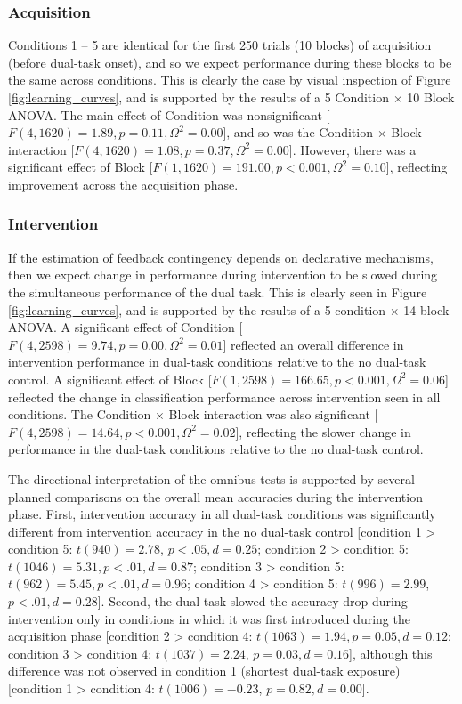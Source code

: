 \subsubsection*{Acquisition}
Conditions 1 -- 5 are identical for the first 250 trials (10 blocks) of
acquisition (before dual-task onset), and so we expect performance during these
blocks to be the same across conditions. This is clearly the case by visual
inspection of Figure \ref{fig:learning_curves}, and is supported by the results
of a 5 Condition $\times$ 10 Block ANOVA. The main effect of Condition was
nonsignificant [$F(4,1620) = 1.89, p = 0.11, \Omega^2 = 0.00$], and so was the
Condition $\times$ Block interaction [$F(4,1620) = 1.08, p = 0.37, \Omega^2 =
0.00$]. However, there was a significant effect of Block [$F(1,1620) = 191.00, p
< 0.001, \Omega^2 = 0.10$], reflecting improvement across the acquisition phase.

\subsubsection*{Intervention}
If the estimation of feedback contingency depends on declarative mechanisms,
then we expect change in performance during intervention to be slowed during the
simultaneous performance of the dual task. This is clearly seen in Figure
\ref{fig:learning_curves}, and is supported by the results of a 5 condition
$\times$ 14 block ANOVA. A significant effect of Condition [$F(4,2598) = 9.74, p
= 0.00, \Omega^2 = 0.01$] reflected an overall difference in intervention
performance in dual-task conditions relative to the no dual-task control. A
significant effect of Block [$F(1,2598) = 166.65, p < 0.001, \Omega^2 = 0.06$]
reflected the change in classification performance across intervention seen in
all conditions. The Condition $\times$ Block interaction was also significant
[$F(4,2598) = 14.64, p < 0.001, \Omega^2 = 0.02$], reflecting the slower change
in performance in the dual-task conditions relative to the no dual-task control.

The directional interpretation of the omnibus tests is supported by several
planned comparisons on the overall mean accuracies during the intervention
phase. First, intervention accuracy in all dual-task conditions was
significantly different from intervention accuracy in the no dual-task
control 
[condition  1 > condition  5: $t(940) = 2.78$, $p < .05, d = 0.25$;
condition  2 > condition  5: $t(1046) = 5.31, p < .01, d = 0.87$;
condition  3 > condition  5: $t(962) = 5.45, p < .01, d = 0.96$;
condition  4 > condition  5: $t(996) = 2.99$, $p < .01, d = 0.28$].
Second, the dual task slowed the accuracy drop during intervention only in
conditions in which it was first introduced during the acquisition phase
[condition  2 > condition  4: $t(1063) = 1.94, p = 0.05, d = 0.12$;
condition  3 > condition  4: $t(1037) = 2.24$, $p = 0.03, d = 0.16$],
although this difference was not observed in condition 1 (shortest dual-task
exposure)
[condition  1 > condition  4: $t(1006) = -0.23$, $p = 0.82, d = 0.00$].

